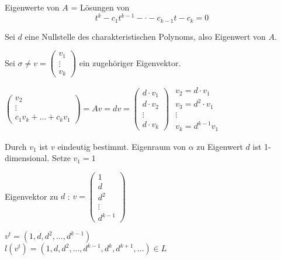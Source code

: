 Eigenwerte von $A$ = Lösungen von
\[ t^k - c_1t^{k-1} - \cdot - c_{k-1}t - c_k = 0 \]

Sei $d$ eine Nullstelle des charakteristischen Polynoms, also Eigenwert von $A$.

Sei $\sigma \neq v = \begin{pmatrix}
v_1 \\ \vdots \\ v_k
\end{pmatrix}$ ein zugehöriger Eigenvektor. 

$\begin{pmatrix}
v_2 \\ \vdots \\ c_1v_k + \dots + c_kv_1
\end{pmatrix}
= Av
= dv
= \begin{pmatrix}
d \cdot v_1 \\ d \cdot v_2 \\ \vdots \\ d \cdot v_k
\end{pmatrix}
$\qquad
$\begin{array}{l}
v_2 = d \cdot v_1 \\
v_3 = d^2 \cdot v_1 \\
\vdots \\
v_k = d^{k-1}v_1
\end{array}$

Durch $v_1$ ist $v$ eindeutig bestimmt. Eigenraum von $\alpha$ zu Eigenwert $d$ ist 1-dimensional. Setze $v_1 = 1$

Eigenvektor zu $d$ : $v = \begin{pmatrix}
1 \\ d \\ d^2 \\ \vdots \\ d^{k-1}
\end{pmatrix}$

$v^t = (1, d, d^2, \dots, d^{k-1})$
\\$l(v^t) = (1, d, d^2, \dots, d^{k-1}, d^k, d^{k+1}, \dots) \in L$

